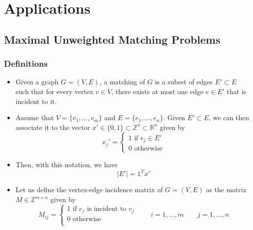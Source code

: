 \documentclass[12pt, openany]{report}
\theoremstyle{definition}
\begin{document}
\chapter{Applications}
\section{Maximal Unweighted Matching Problems}
\subsection{Definitions}
\begin{itemize}
    \item Given a graph \(G=(V,E)\), a matching of \(G\) is a subset of edges \(E'\subset E\) such that for every vertex \(v\in V\), there exists at most one edge \(e\in E'\) that is incident to it.
    \item Assume that \(V=\{v_1,\dots,v_m\}\) and \(E=\{e_1,\dots, e_n\}\). Given \(E'\subset E\), we can then associate it to the vector \(x'\in \{0,1\}\subset \mathbb{Z}^n\subset \mathbb{R}^n\) given by 
    \begin{equation}
        x_j' = \begin{cases}
            1 \text{ if } e_j \in E'\\
            0\text{ otherwise}
        \end{cases}
    \end{equation}
    \item Then, with this notation, we have 
    \begin{equation}
        |E'| = \mathbb{1}^Tx'
    \end{equation}
    \item Let us define the vertex-edge incidence matrix of \(G=(V,E)\) as the matrix \(M\in \mathbb{Z}^{m\times n}\) given by
    \begin{equation}
        M_{ij} = \begin{cases} 1 \text{ if }e_j\text{ is incident to }v_j\\ 0 \text{ otherwise}\\ \end{cases} \qquad i=1,\dots,m\qquad j=1,\dots,n
    \end{equation}
\end{itemize}
\end{document}
